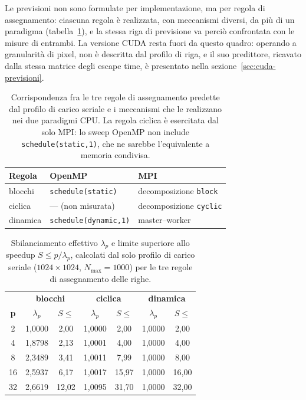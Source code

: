 Le previsioni non sono formulate per implementazione, ma per regola di
assegnamento: ciascuna regola è realizzata, con meccanismi diversi, da più di un
paradigma (tabella~\ref{tab:regole-paradigmi}), e la stessa riga di previsione va
perciò confrontata con le misure di entrambi. La versione CUDA resta fuori da
questo quadro: operando a granularità di pixel, non è descritta dal profilo di
riga, e il suo predittore, ricavato dalla stessa matrice degli escape time, è
presentato nella sezione~\ref{sec:cuda-previsioni}.
\vspace{2,5mm}
\begin{table}[htbp]
    \centering
    \begin{tabular}{lll}
        \hline
        Regola & OpenMP & MPI \\
        \hline
        blocchi  & \texttt{schedule(static)} & decomposizione \texttt{block} \\
        ciclica  & --- (non misurata) & decomposizione \texttt{cyclic} \\
        dinamica & \texttt{schedule(dynamic,1)} & master--worker \\
        \hline
    \end{tabular}
    \caption{Corrispondenza fra le tre regole di assegnamento predette dal profilo
    di carico seriale e i meccanismi che le realizzano nei due paradigmi CPU. La
    regola ciclica è esercitata dal solo MPI: lo sweep OpenMP non include
    \texttt{schedule(static,1)}, che ne sarebbe l'equivalente a memoria condivisa.}
    \label{tab:regole-paradigmi}
\end{table}
\vspace{2,5mm}
\begin{table}[H]
    \centering
    \begin{tabular}{ccccccc}
        \hline
        & \multicolumn{2}{c}{\textbf{blocchi}} & \multicolumn{2}{c}{\textbf{ciclica}} & \multicolumn{2}{c}{\textbf{dinamica}} \\
        \textbf{p} & $\lambda_p$ & $S \le$ & $\lambda_p$ & $S \le$ & $\lambda_p$ & $S \le$ \\ \hline
        2  & 1{,}0000 & 2{,}00  & 1{,}0000 & 2{,}00  & 1{,}0000 & 2{,}00 \\
        4  & 1{,}8798 & 2{,}13  & 1{,}0001 & 4{,}00  & 1{,}0000 & 4{,}00 \\
        8  & 2{,}3489 & 3{,}41  & 1{,}0011 & 7{,}99  & 1{,}0000 & 8{,}00 \\
        16 & 2{,}5937 & 6{,}17  & 1{,}0017 & 15{,}97 & 1{,}0000 & 16{,}00 \\
        32 & 2{,}6619 & 12{,}02 & 1{,}0095 & 31{,}70 & 1{,}0000 & 32{,}00 \\
    \end{tabular}
    \caption{Sbilanciamento effettivo $\lambda_p$ e limite superiore allo
    speedup $S \le p/\lambda_p$, calcolati dal solo profilo di carico
    seriale ($1024\times1024$, $N_{\max}=1000$) per le tre regole di
    assegnamento delle righe.}
    \label{tab:serial_pred_lambdaP}
\end{table}

